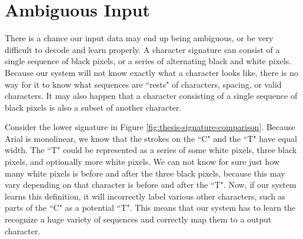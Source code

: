 
\section{Ambiguous Input}
\label{sec:ambiguous_input}
There is a chance our input data may end up being ambiguous, or be very difficult to decode and learn properly. A character signature can consist of a single sequence of black pixels, or a series of alternating black and white pixels. Because our system will not know exactly what a character looks like, there is no way for it to know what sequences are ``rests" of characters, spacing, or valid characters. It may also happen that a character consisting of a single sequence of black pixels is also a subset of another character. 

Consider the lower signature in Figure \ref{fig:thesis-signature-comparison}. Because Arial is monolinear, we know that the strokes on the ``C" and the ``T" have equal width. The ``T" could be represented as a series of some white pixels, three black pixels, and optionally more white pixels. We can not know for sure just how many white pixels is before and after the three black pixels, because this may vary depending on that character is before and after the ``T". Now, if our system learns this definition, it will incorrectly label various other characters, such as parts of the ``C" as a potential ``T". This means that our system has to learn the recognize a huge variety of sequences and correctly map them to a output character.

